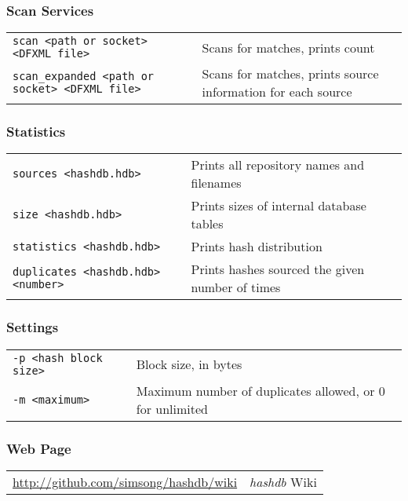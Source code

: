 \documentclass[12pt]{article}
\newcommand{\hdb}{\emph{hashdb}\xspace}
\begin{document}
\subsubsection*{Scan Services}
\begin{tabular}{p{8 cm} p{9 cm} }
\texttt{scan <path or socket> <DFXML file>} & Scans for matches, prints count\\
\texttt{scan\_expanded <path or socket> <DFXML file>} & Scans for matches, prints source information for each source \\
\end{tabular}

\subsubsection*{Statistics}
\begin{tabular}{p{8 cm} p{9 cm} }
\texttt{sources <hashdb.hdb>} & Prints all repository names and filenames \\
\texttt{size <hashdb.hdb>} & Prints sizes of internal database tables \\
\texttt{statistics <hashdb.hdb>} & Prints hash distribution \\
\texttt{duplicates <hashdb.hdb> <number>} & Prints hashes sourced the given number of times \\
\end{tabular}

\subsubsection*{Settings}
\begin{tabular}{p{8 cm} p{9 cm} }
\texttt{-p <hash block size>} & Block size, in bytes \\
\texttt{-m <maximum>} & Maximum number of duplicates allowed, or 0 for unlimited\\
\end{tabular}

\subsubsection*{Web Page}
\begin{tabular}{p{8 cm} p{9 cm} }
\url{http://github.com/simsong/hashdb/wiki} & \hdb Wiki \\
\end{tabular}
\end{document}
